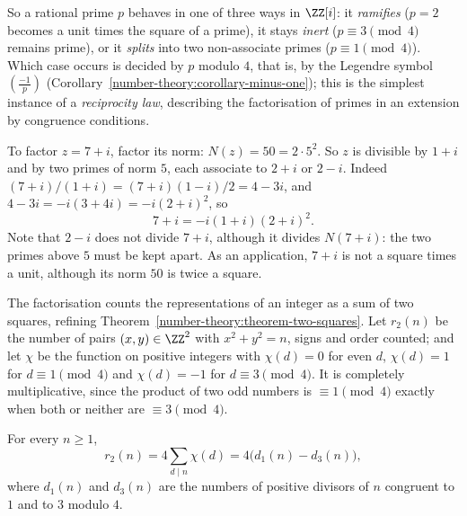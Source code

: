 So a rational prime $p$ behaves in one of three ways in $\ZZ[i]$: it \emph{ramifies} ($p = 2$ becomes a unit times the square of a prime), it stays \emph{inert} ($p \equiv 3 \pmod 4$ remains prime), or it
\emph{splits} into two non-associate primes ($p \equiv 1 \pmod 4$). Which case occurs is decided by $p$ modulo $4$, that is, by the Legendre symbol $(\frac{-1}{p})$
(Corollary~\ref{number-theory:corollary-minus-one}); this is the simplest instance of a \emph{reciprocity law}, describing the factorisation of primes in an extension by congruence conditions.

\begin{example}\label{number-theory:example-gaussian-factorisation}
To factor $z = 7 + i$, factor its norm: $N(z) = 50 = 2 \cdot 5^2$. So $z$ is divisible by $1 + i$ and by two primes of norm $5$, each associate to $2 + i$ or $2 - i$. Indeed
$(7 + i)/(1 + i) = (7 + i)(1 - i)/2 = 4 - 3i$, and $4 - 3i = -i(3 + 4i) = -i(2 + i)^2$, so
\[
7 + i = -i(1 + i)(2 + i)^2 .
\]
Note that $2 - i$ does not divide $7 + i$, although it divides $N(7 + i)$: the two primes above $5$ must be kept apart. As an application, $7 + i$ is not a square times a unit, although its norm $50$ is
twice a square.
\end{example}

The factorisation counts the representations of an integer as a sum of two squares, refining Theorem~\ref{number-theory:theorem-two-squares}. Let $r_2(n)$ be the number of pairs
$(x, y) \in \ZZ^2$ with $x^2 + y^2 = n$, signs and order counted; and let $\chi$ be the function on positive integers with $\chi(d) = 0$ for even $d$, $\chi(d) = 1$ for $d \equiv 1 \pmod 4$ and
$\chi(d) = -1$ for $d \equiv 3 \pmod 4$. It is completely multiplicative, since the product of two odd numbers is $\equiv 1 \pmod 4$ exactly when both or neither are $\equiv 3 \pmod 4$.

\begin{theorem}\label{number-theory:theorem-jacobi-two-squares}
For every $n \geq 1$,
\[
r_2(n) = 4\sum_{d \mid n}\chi(d) = 4\bigl(d_1(n) - d_3(n)\bigr),
\]
where $d_1(n)$ and $d_3(n)$ are the numbers of positive divisors of $n$ congruent to $1$ and to $3$ modulo $4$.
\end{theorem}

